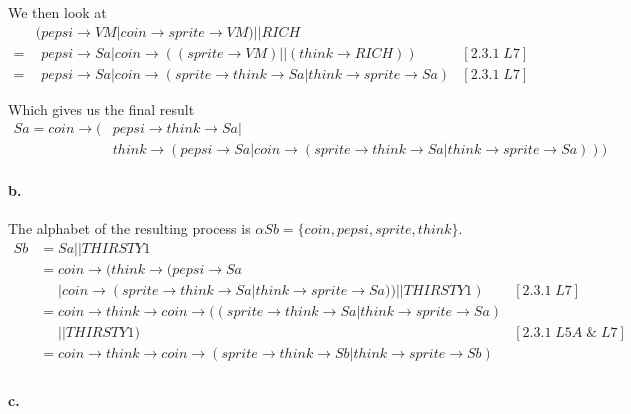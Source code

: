 \documentclass[a4paper, 11pt]{article}
\begin{document}
We then look at
\begin{align*}
&(pepsi \rightarrow VM | coin \rightarrow sprite \rightarrow VM) || RICH \\
= &\phantom{(} pepsi \rightarrow Sa | coin \rightarrow ((sprite \rightarrow VM) || (think \rightarrow RICH)) & [2.3.1\;L7] \\
= &\phantom{(} pepsi \rightarrow Sa | coin \rightarrow (sprite \rightarrow think \rightarrow Sa | think \rightarrow sprite \rightarrow Sa) & [2.3.1\;L7]
\end{align*}

Which gives us the final result
\begin{align*}
Sa = coin \rightarrow (&pepsi \rightarrow think \rightarrow Sa | \\
    &think \rightarrow (pepsi \rightarrow Sa | coin \rightarrow (sprite \rightarrow think \rightarrow Sa | think \rightarrow sprite \rightarrow Sa)))
\end{align*}


\paragraph{b.} %
\label{par:b_}

The alphabet of the resulting process is $\alpha Sb = \{coin, pepsi, sprite, think\}$.
\begin{align*}
Sb &= Sa || THIRSTY1 \\
    &= coin \rightarrow (think \rightarrow (pepsi \rightarrow Sa \\
    &\phantom{=} | coin \rightarrow (sprite \rightarrow think \rightarrow Sa | think \rightarrow sprite \rightarrow Sa)) || THIRSTY1) & [2.3.1\;L7] \\
    &= coin \rightarrow think \rightarrow coin \rightarrow ((sprite \rightarrow think \rightarrow Sa | think \rightarrow sprite \rightarrow Sa) \\
    &\phantom{=} || THIRSTY1) & [2.3.1\;L5A\;\&\;L7] \\
    &= coin \rightarrow think \rightarrow coin \rightarrow (sprite \rightarrow think \rightarrow Sb | think \rightarrow sprite \rightarrow Sb) \\
\end{align*}


\paragraph{c.} %
\label{par:c_}
\end{document}
